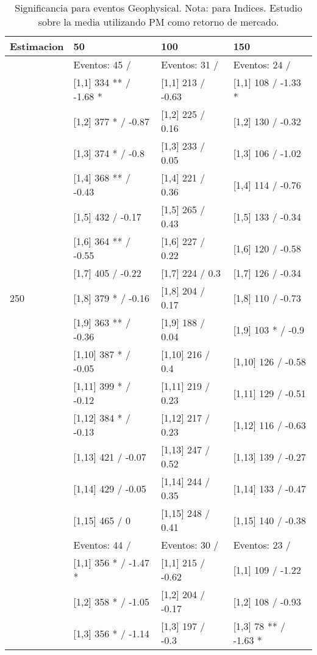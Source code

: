 \begin{table}

\caption{Significancia para eventos Geophysical. Nota: para Indices. Estudio sobre la media utilizando PM como retorno de mercado.}
\centering
\begin{tabular}[t]{llll}
\toprule
Estimacion & 50 & 100 & 150\\
\midrule
 & Eventos:  45 / & Eventos:  31 / & Eventos:  24 /\\
 & {}[1,1] 334 ** / -1.68 * & {}[1,1] 213  / -0.63 & {}[1,1] 108  / -1.33 *\\
 & {}[1,2] 377 * / -0.87 & {}[1,2] 225  / 0.16 & {}[1,2] 130  / -0.32\\
 & {}[1,3] 374 * / -0.8 & {}[1,3] 233  / 0.05 & {}[1,3] 106  / -1.02\\
 & {}[1,4] 368 ** / -0.43 & {}[1,4] 221  / 0.36 & {}[1,4] 114  / -0.76\\
\addlinespace
 & {}[1,5] 432  / -0.17 & {}[1,5] 265  / 0.43 & {}[1,5] 133  / -0.34\\
 & {}[1,6] 364 ** / -0.55 & {}[1,6] 227  / 0.22 & {}[1,6] 120  / -0.58\\
 & {}[1,7] 405  / -0.22 & {}[1,7] 224  / 0.3 & {}[1,7] 126  / -0.34\\
250 & {}[1,8] 379 * / -0.16 & {}[1,8] 204  / 0.17 & {}[1,8] 110  / -0.73\\
 & {}[1,9] 363 ** / -0.36 & {}[1,9] 188  / 0.04 & {}[1,9] 103 * / -0.9\\
\addlinespace
 & {}[1,10] 387 * / -0.05 & {}[1,10] 216  / 0.4 & {}[1,10] 126  / -0.58\\
 & {}[1,11] 399 * / -0.12 & {}[1,11] 219  / 0.23 & {}[1,11] 129  / -0.51\\
 & {}[1,12] 384 * / -0.13 & {}[1,12] 217  / 0.23 & {}[1,12] 116  / -0.63\\
 & {}[1,13] 421  / -0.07 & {}[1,13] 247  / 0.52 & {}[1,13] 139  / -0.27\\
 & {}[1,14] 429  / -0.05 & {}[1,14] 244  / 0.35 & {}[1,14] 133  / -0.47\\
\addlinespace
 & {}[1,15] 465  / 0 & {}[1,15] 248  / 0.41 & {}[1,15] 140  / -0.38\\
 & Eventos:  44 / & Eventos:  30 / & Eventos:  23 /\\
 & {}[1,1] 356 * / -1.47 * & {}[1,1] 215  / -0.62 & {}[1,1] 109  / -1.22\\
 & {}[1,2] 358 * / -1.05 & {}[1,2] 204  / -0.17 & {}[1,2] 108  / -0.93\\
 & {}[1,3] 356 * / -1.14 & {}[1,3] 197  / -0.3 & {}[1,3] 78 ** / -1.63 *\\

\end{tabular}
\end{table}
